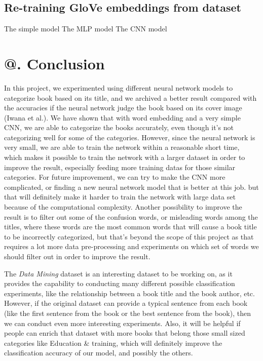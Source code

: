 \documentclass[jou,apacite, 10px]{apa6}
\makeatletter
\newcommand*{\rom}[1]{\expandafter\@slowromancap\romannumeral #1@}
\makeatother
\begin{document}
\subsection {Re-training GloVe embeddings from dataset}
The simple model
The MLP model
The CNN model

\section{\rom{6}. Conclusion}
In this project, we experimented using different neural network models to categorize book based on its title, and we archived a better result compared with the accuracies if the neural network judge the book based on its cover image (Iwana et al.). We have shown that with word embedding and a very simple CNN, we are able to categorize the books accurately, even though it's not categorizing well for some of the categories. However, since the neural network is very small, we are able to train the network within a reasonable short time, which makes it possible to train the network with a larger dataset in order to improve the result, especially feeding more training datas for those similar categories. For future improvement, we can try to make the CNN more complicated, or finding a new neural network model that is better at this job. but that will definitely make it harder to train the network with large data set because of the computational complexity. Another possibility to improve the result is to filter out some of the confusion words, or misleading words among the titles, where these words are the most common words that will cause a book title to be incorrectly categorized, but that's beyond the scope of this project as that requires a lot more data pre-processing and experiments on which set of words we should filter out in order to improve the result.

 The \textit{Data Mining} dataset is an interesting dataset to be working on, as it provides the capability to conducting many different possible classification experiments, like the relationship between a book title and the book author, etc. However, if the original dataset can provide a typical sentence from each book (like the first sentence from the book or the best sentence from the book), then we can conduct even more interesting experiments. Also, it will be helpful if people can enrich that dataset with more books that belong those small sized categories like Education \& training, which will definitely improve the classification accuracy of our model, and possibly the others.
\end{document}
